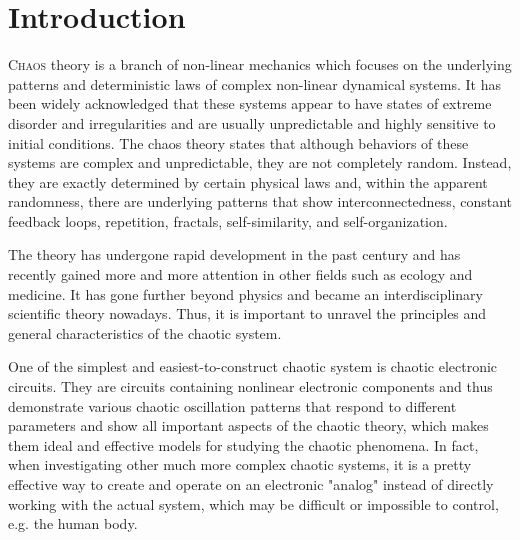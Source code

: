 \documentclass[10pt,a4paper,twocolumn,twoside,UTF8]{article}
\begin{document}
\renewcommand{\thefootnote}{\fnsymbol{footnote}}

\thispagestyle{firstpage} 
\pagestyle{maincontent}

\section{Introduction}
\lettrine[lines=2]{C}{haos} theory is a branch of non-linear mechanics which focuses on the underlying patterns and deterministic laws of complex non-linear dynamical systems.
It has been widely acknowledged that these systems appear to have states of extreme disorder and irregularities and are usually unpredictable and highly sensitive to initial conditions.
The chaos theory states that although behaviors of these systems are complex and unpredictable, they are not completely random. 
Instead, they are exactly determined by certain physical laws and, within the apparent randomness, 
there are underlying patterns that show interconnectedness, constant feedback loops, repetition, fractals, self-similarity, and self-organization\autocite{sekarChaosMechanicalSystems1995}.

The theory has undergone rapid development in the past century and has recently gained more and more attention in other fields such as 
ecology\autocite{yinConstructingPostClassicalEcosystems2011} and medicine\autocite{oestreicherHistoryChaosTheory2007}.
It has gone further beyond physics and became an interdisciplinary scientific theory nowadays.
Thus, it is important to unravel the principles and general characteristics of the chaotic system.

One of the simplest and easiest-to-construct chaotic system is chaotic electronic circuits. 
They are circuits containing nonlinear electronic components and thus demonstrate various chaotic oscillation patterns that respond to different parameters and show all important aspects of the chaotic theory,
which makes them ideal and effective models for studying the chaotic phenomena.
In fact, when investigating other much more complex chaotic systems, it is a pretty effective way to create and operate on an electronic "analog" instead of directly working with the actual system, which may be difficult or impossible to control, e.g. the human body.
\end{document}
